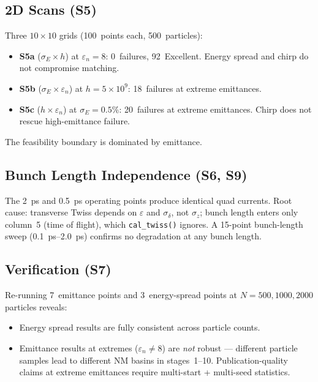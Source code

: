 \documentclass[11pt]{article}
\begin{document}
\subsection{2D Scans (S5)}

Three $10\times10$ grids (100~points each, 500~particles):
\begin{itemize}[nosep]
  \item \textbf{S5a} ($\sigma_E \times h$) at $\varepsilon_n = 8$:
    0~failures, 92~Excellent.  Energy spread and chirp do not compromise
    matching.
  \item \textbf{S5b} ($\sigma_E \times \varepsilon_n$) at $h = 5 \times
    10^9$: 18~failures at extreme emittances.
  \item \textbf{S5c} ($h \times \varepsilon_n$) at $\sigma_E = 0.5\%$:
    20~failures at extreme emittances.  Chirp does not rescue
    high-emittance failure.
\end{itemize}
The feasibility boundary is dominated by emittance.

\subsection{Bunch Length Independence (S6, S9)}

The 2~ps and 0.5~ps operating points produce identical quad currents.
Root cause: transverse Twiss depends on $\varepsilon$ and $\sigma_\delta$,
not $\sigma_z$; bunch length enters only column~5 (time of flight), which
\texttt{cal\_twiss()} ignores.  A 15-point bunch-length sweep
(\SIrange{0.1}{2.0}{ps}) confirms no degradation at any bunch length.

\subsection{Verification (S7)}

Re-running 7~emittance points and 3~energy-spread points at
$N = 500, 1000, 2000$ particles reveals:
\begin{itemize}[nosep]
  \item Energy spread results are fully consistent across particle counts.
  \item Emittance results at extremes ($\varepsilon_n \neq 8$) are
    \emph{not} robust --- different particle samples lead to different NM
    basins in stages~1--10.  Publication-quality claims at extreme
    emittances require multi-start + multi-seed statistics.
\end{itemize}
\end{document}
